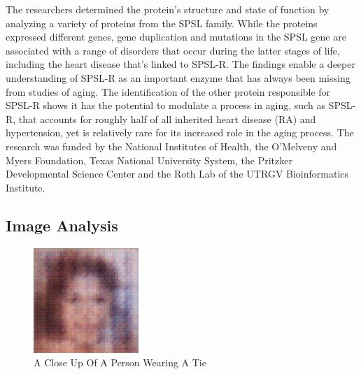 \documentclass{article}%
\begin{document}
The researchers determined the protein's structure and state of function by analyzing a variety of proteins from the SPSL family. While the proteins expressed different genes, gene duplication and mutations in the SPSL gene are associated with a range of disorders that occur during the latter stages of life, including the heart disease that's linked to SPSL{-}R.\newline%
The findings enable a deeper understanding of SPSL{-}R as an important enzyme that has always been missing from studies of aging. The identification of the other protein responsible for SPSL{-}R shows it has the potential to modulate a process in aging, such as SPSL{-}R, that accounts for roughly half of all inherited heart disease (RA) and hypertension, yet is relatively rare for its increased role in the aging process.\newline%
The research was funded by the National Institutes of Health, the O'Melveny and Myers Foundation, Texas National University System, the Pritzker Developmental Science Center and the Roth Lab of the UTRGV Bioinformatics Institute.

%
\subsection{Image Analysis}%
\label{subsec:ImageAnalysis}%


\begin{figure}[h!]%
\centering%
\includegraphics[width=150px]{500_fake_images/samples_5_120.png}%
\caption{A Close Up Of A Person Wearing A Tie}%
\end{figure}

%
\end{document}
